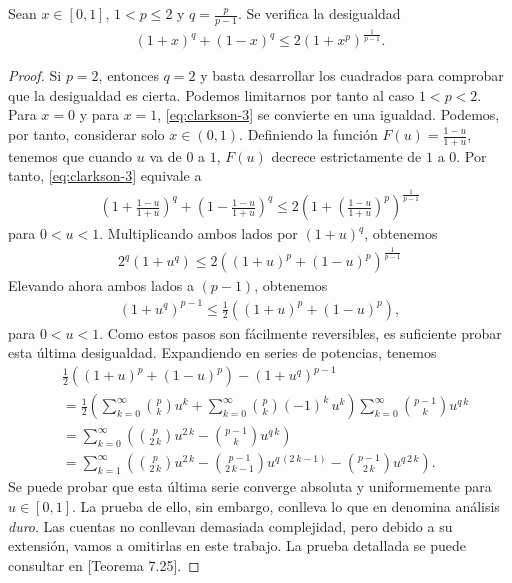 \begin{lemma}
    Sean $ x \in [0, 1] $, $ 1 < p \leq 2 $ y $ q = \frac{p}{p-1} $. Se verifica la desigualdad
    \begin{align} \label{eq:clarkson-3}
        (1+x)^q + (1-x)^q \leq 2(1+x^p)^\frac{1}{p-1}.
    \end{align}
\end{lemma}
\begin{proof}
    Si $ p = 2 $, entonces $ q = 2 $ y basta desarrollar los cuadrados para comprobar que la desigualdad es cierta. Podemos limitarnos por tanto al caso $ 1 < p < 2 $. Para $ x = 0 $ y para $ x = 1 $, \eqref{eq:clarkson-3} se convierte en una igualdad. Podemos, por tanto, considerar solo $ x \in (0, 1) $. Definiendo la función $ F(u) = \frac{1 - u}{1 + u} $, tenemos que cuando $ u $ va de $0$ a $1$, $ F(u) $ decrece estrictamente de $1$ a $0$. Por tanto, \eqref{eq:clarkson-3} equivale a
    \begin{align}
        \left(1 + \frac{1 - u}{1 + u}\right)^q + \left(1 - \frac{1 - u}{1 + u}\right)^q \leq 2 \left( 1 + \left( \frac{1 - u}{1 + u} \right)^p \right)^{\frac{1}{p-1}}
    \end{align}
    para $ 0 < u < 1 $. Multiplicando ambos lados por $ (1 + u)^q $, obtenemos
    \begin{align}
        2^q (1 + u^q) \leq 2 \left( (1 + u)^p + (1 - u)^p \right)^{\frac{1}{p-1}}
    \end{align}
    Elevando ahora ambos lados a $ (p - 1) $, obtenemos
    \begin{align}
        (1 + u^q)^{p-1} \leq \frac{1}{2} \left( (1 + u)^p + (1 - u)^p \right),
    \end{align}
    para $ 0 < u < 1 $. Como estos pasos son fácilmente reversibles, es suficiente probar esta última desigualdad. Expandiendo en series de potencias, tenemos
    \begin{align}
        &\frac{1}{2}\left((1+u)^{p}+(1-u)^{p}\right)-(1+u^{q})^{p-1} \\
        &= \frac{1}{2}\left(\sum_{k=0}^{\infty}\binom{p}{k}u^{k}+\sum_{k=0}^{\infty}\binom{p}{k}(-1)^{k}\,u^{k}\right)\sum_{k=0}^{\infty}\binom{p-1}{k}u^{q\,k} \\
        &= \sum_{k=0}^{\infty}\left(\binom{p}{2\,k}u^{2\,k}-\binom{p-1}{k}u^{q\,k}\right) \\
        &= \sum_{k=1}^{\infty}\left(\binom{p}{2\,k}u^{2\,k} - \binom{p-1}{2\,k-1}u^{q\,(2\,k-1)}-\binom{p-1}{2\,k}u^{q\,2\,k}\right).
    \end{align}
    Se puede probar que esta última serie converge absoluta y uniformemente para $ u \in [0, 1] $. La prueba de ello, sin embargo, conlleva lo que en \cite{hewitt} denomina análisis {\it duro}. Las cuentas no conllevan demasiada complejidad, pero debido a su extensión, vamos a omitirlas en este trabajo. La prueba detallada se puede consultar en \cite{hewitt}[Teorema 7.25].
    

\end{proof}
